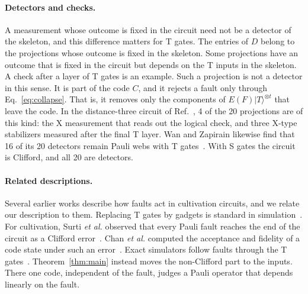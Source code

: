 \documentclass[aps,prl,reprint,twocolumn,amsmath,amssymb,floatfix,nofootinbib,superscriptaddress]{revtex4-2}
\theoremstyle{definition}
\theoremstyle{remark}
\begin{document}
\paragraph*{Detectors and checks.}
A measurement whose outcome is fixed in the circuit need not be a detector of the skeleton, and this difference matters for T gates. The entries of $D$ belong to the projections whose outcome is fixed in the skeleton. Some projections have an outcome that is fixed in the circuit but depends on the T inputs in the skeleton. A check after a layer of T gates is an example. Such a projection is not a detector in this sense. It is part of the code $C$, and it rejects a fault only through Eq.~\eqref{eq:collapse}. That is, it removes only the components of $E(F)|T\rangle^{\otimes t}$ that leave the code. In the distance-three circuit of Ref.~\cite{cultivation}, 4 of the 20 projections are of this kind: the X measurement that reads out the logical check, and three X-type stabilizers measured after the final T layer. Wan and Zapirain likewise find that 16 of its 20 detectors remain Pauli webs with T gates~\cite{wanzapirain}. With S gates the circuit is Clifford, and all 20 are detectors.

\paragraph*{Related descriptions.}
Several earlier works describe how faults act in cultivation circuits, and we relate our description to them. Replacing T gates by gadgets is standard in simulation~\cite{bravyigosset}. For cultivation, Surti \emph{et al.} observed that every Pauli fault reaches the end of the circuit as a Clifford error~\cite{surti}. Chan \emph{et al.} computed the acceptance and fidelity of a code state under such an error~\cite{chan}. Exact simulators follow faults through the T gates~\cite{soft,clifft,symft,wanzhong,takada,wanzapirain,syqma}. Theorem~\ref{thm:main} instead moves the non-Clifford part to the inputs. There one code, independent of the fault, judges a Pauli operator that depends linearly on the fault.
\end{document}
